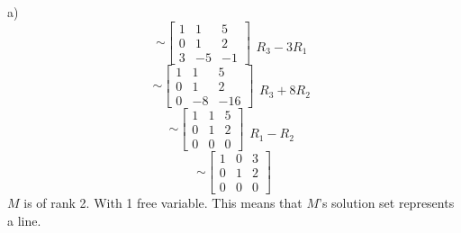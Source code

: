 \documentclass[12pt]{article}
\newcommand{\sqbrl}{\left[}
\newcommand{\sqbrr}{\right]}
\begin{document}
a)\\
	\[\sim
	\sqbrl\begin{matrix}
	1 & 1 & 5\\
	0 & 1 & 2\\
	3& -5 & -1\end{matrix}\sqbrr\begin{matrix}\\\\R_3 - 3R_1\end{matrix}\]
	\[\sim
	\sqbrl\begin{matrix}
	1 & 1 & 5\\
	0 & 1 & 2\\
	0& -8 & -16\end{matrix}\sqbrr\begin{matrix}\\\\R_3 + 8R_2\end{matrix}\]
	\[\sim
	\sqbrl\begin{matrix}
	1 & 1 & 5\\
	0 & 1 & 2\\
	0& 0 & 0\end{matrix}\sqbrr\begin{matrix}\\\\R_1- R_2\end{matrix}\]
	\[\sim
	\sqbrl\begin{matrix}
	1 & 0 & 3\\
	0 & 1 & 2\\
	0& 0 & 0\end{matrix}\sqbrr\]
$M$ is of rank 2. With 1 free variable. This means that $M$'s solution set represents a line.\\
\end{document}

